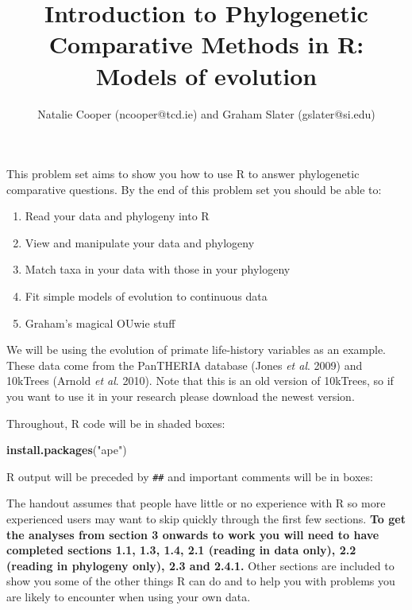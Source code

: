 \documentclass[11pt]{article}
\newcommand{\KeywordTok}[1]{\textcolor[rgb]{0.13,0.29,0.53}{\textbf{{#1}}}}
\newcommand{\StringTok}[1]{\textcolor[rgb]{0.31,0.60,0.02}{{#1}}}
\newcommand{\NormalTok}[1]{{#1}}
\begin{document}
\title{Introduction to Phylogenetic Comparative Methods in R: Models of evolution}
\author{Natalie Cooper (ncooper@tcd.ie) and Graham Slater (gslater@si.edu)}
\date{}
\maketitle

This problem set aims to show you how to use R to answer phylogenetic 
comparative questions. By the end of this problem set you should be able to:

\begin{enumerate}
\item Read your data and phylogeny into R
\item View and manipulate your data and phylogeny
\item Match taxa in your data with those in your phylogeny
\item Fit simple models of evolution to continuous data
\item Graham's magical OUwie stuff
\end{enumerate}

We will be using the evolution of primate life-history variables as an
example. These data come from the PanTHERIA database (Jones \textit{et
al}. 2009) and 10kTrees (Arnold \textit{et al}. 2010). Note that this is
an old version of 10kTrees, so if you want to use it in your research
please download the newest version.

Throughout, R code will be in shaded boxes:

\begin{snugshade}
\begin{Highlighting}[]
\KeywordTok{install.packages}\NormalTok{(}\StringTok{"ape"}\NormalTok{)}
\end{Highlighting}
\end{snugshade}

R output will be preceded by \texttt{\#\#} and important comments will be in boxes:

\begin{framed}

The handout assumes that people have little or no experience with R so 
more experienced users may want to skip quickly through the first 
few sections. \textbf{To get the analyses from section 3 onwards to work you 
will need to have completed sections 1.1, 1.3, 1.4, 2.1 (reading in data only), 
2.2 (reading in phylogeny only), 2.3 and 2.4.1.} Other sections are included to show 
you some of the other things R can do and to help you with problems you are 
likely to encounter when using your own data. 
\end{framed}
\end{document}
